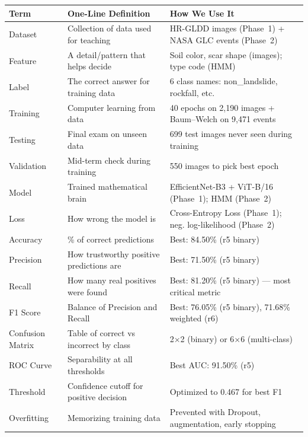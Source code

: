 \documentclass[11pt]{article}
\begin{document}
\begin{center}
\small
\renewcommand{\arraystretch}{1.25}
\begin{tabularx}{\textwidth}{@{}lXX@{}}
\toprule
\textbf{Term} & \textbf{One-Line Definition} & \textbf{How We Use It} \\
\midrule
Dataset        & Collection of data used for teaching        & HR-GLDD images (Phase~1) + NASA GLC events (Phase~2) \\
Feature        & A detail/pattern that helps decide           & Soil color, scar shape (images); type code (HMM) \\
Label          & The correct answer for training data         & 6 class names: non\_landslide, rockfall, etc. \\
Training       & Computer learning from data                  & 40 epochs on 2,190 images + Baum--Welch on 9,471 events \\
Testing        & Final exam on unseen data                    & 699 test images never seen during training \\
Validation     & Mid-term check during training               & 550 images to pick best epoch \\
Model          & Trained mathematical brain                   & EfficientNet-B3 + ViT-B/16 (Phase~1); HMM (Phase~2) \\
Loss           & How wrong the model is                       & Cross-Entropy Loss (Phase~1); neg. log-likelihood (Phase~2) \\
Accuracy       & \% of correct predictions                    & Best: 84.50\% (r5 binary) \\
Precision      & How trustworthy positive predictions are     & Best: 71.50\% (r5 binary) \\
Recall         & How many real positives were found            & Best: 81.20\% (r5 binary) --- most critical metric \\
F1 Score       & Balance of Precision and Recall              & Best: 76.05\% (r5 binary), 71.68\% weighted (r6) \\
Confusion Matrix & Table of correct vs incorrect by class     & 2$\times$2 (binary) or 6$\times$6 (multi-class) \\
ROC Curve      & Separability at all thresholds               & Best AUC: 91.50\% (r5) \\
Threshold      & Confidence cutoff for positive decision      & Optimized to 0.467 for best F1 \\
Overfitting    & Memorizing training data                     & Prevented with Dropout, augmentation, early stopping \\

\end{tabularx}
\end{center}
\end{document}
